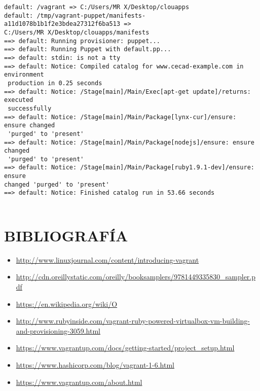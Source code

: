 \documentclass[10pt]{article}   			%
\begin{document}
\begin{enumerate}
\begin{small}
\begin{lstlisting}[frame=single]
default: /vagrant => C:/Users/MR X/Desktop/clouapps
default: /tmp/vagrant-puppet/manifests-a11d1078b1b1f2e3bdea27312f6ba513 => 
C:/Users/MR X/Desktop/clouapps/manifests
==> default: Running provisioner: puppet...
==> default: Running Puppet with default.pp...
==> default: stdin: is not a tty
==> default: Notice: Compiled catalog for www.cecad-example.com in environment
 production in 0.25 seconds
==> default: Notice: /Stage[main]/Main/Exec[apt-get update]/returns: executed
 successfully
==> default: Notice: /Stage[main]/Main/Package[lynx-cur]/ensure: ensure changed
 'purged' to 'present'
==> default: Notice: /Stage[main]/Main/Package[nodejs]/ensure: ensure changed
 'purged' to 'present'
==> default: Notice: /Stage[main]/Main/Package[ruby1.9.1-dev]/ensure: ensure 
changed 'purged' to 'present'
==> default: Notice: Finished catalog run in 53.66 seconds


	\end{lstlisting}
\end{small}





\end{enumerate}

\section{BIBLIOGRAFÍA}	
\begin{itemize}
	\item \href{http://www.linuxjournal.com/content/introducing-vagrant
		}{http://www.linuxjournal.com/content/introducing-vagrant
		}
	\item \href{http://cdn.oreillystatic.com/oreilly/booksamplers/9781449335830\_sampler.pdf
		}{http://cdn.oreillystatic.com/oreilly/booksamplers/9781449335830\_sampler.pdf
		}
	\item \href{https://en.wikipedia.org/wiki/O%
		}{https://en.wikipedia.org/wiki/O%
		}
	\item \href{http://www.rubyinside.com/vagrant-ruby-powered-virtualbox-vm-building-and-provisioning-3059.html
		}{http://www.rubyinside.com/vagrant-ruby-powered-virtualbox-vm-building-and-provisioning-3059.html
		}
	\item \href{https://www.vagrantup.com/docs/getting-started/project\_setup.html
		
		}{https://www.vagrantup.com/docs/getting-started/project\_setup.html}
	\item \href{https://www.hashicorp.com/blog/vagrant-1-6.html
		}{https://www.hashicorp.com/blog/vagrant-1-6.html
		}
	\item \href{https://www.vagrantup.com/about.html
		}{https://www.vagrantup.com/about.html
		}
\end{itemize}
\end{document}
